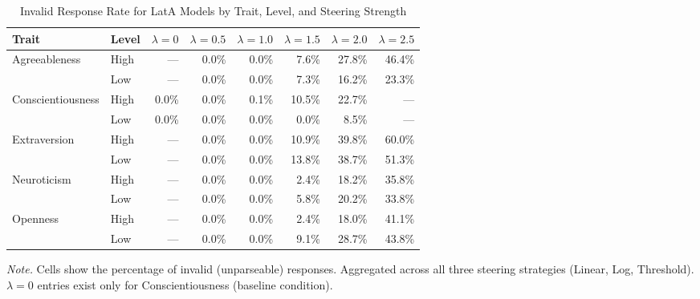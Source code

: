 \begin{table}[htbp]
\begin{threeparttable}
\caption{Invalid Response Rate for LatA Models by Trait, Level, and Steering Strength}
\label{tab:lata_lambda_validity}
\centering
\footnotesize
\setlength{\tabcolsep}{4pt}
\begin{tabular}{llrrrrrr}
\toprule
Trait & Level & $\lambda=0$ & $\lambda=0.5$ & $\lambda=1.0$ & $\lambda=1.5$ & $\lambda=2.0$ & $\lambda=2.5$ \\
\midrule
  Agreeableness & High & — & 0.0\% & 0.0\% & 7.6\% & 27.8\% & 46.4\% \\
   & Low & — & 0.0\% & 0.0\% & 7.3\% & 16.2\% & 23.3\% \\
\addlinespace
  Conscientiousness & High & 0.0\% & 0.0\% & 0.1\% & 10.5\% & 22.7\% & — \\
   & Low & 0.0\% & 0.0\% & 0.0\% & 0.0\% & 8.5\% & — \\
\addlinespace
  Extraversion & High & — & 0.0\% & 0.0\% & 10.9\% & 39.8\% & 60.0\% \\
   & Low & — & 0.0\% & 0.0\% & 13.8\% & 38.7\% & 51.3\% \\
\addlinespace
  Neuroticism & High & — & 0.0\% & 0.0\% & 2.4\% & 18.2\% & 35.8\% \\
   & Low & — & 0.0\% & 0.0\% & 5.8\% & 20.2\% & 33.8\% \\
\addlinespace
  Openness & High & — & 0.0\% & 0.0\% & 2.4\% & 18.0\% & 41.1\% \\
   & Low & — & 0.0\% & 0.0\% & 9.1\% & 28.7\% & 43.8\% \\
\bottomrule
\end{tabular}
\begin{tablenotes}
\footnotesize
\item \textit{Note.} Cells show the percentage of invalid (unparseable) responses. Aggregated across all three steering strategies (Linear, Log, Threshold). $\lambda = 0$ entries exist only for Conscientiousness (baseline condition).
\end{tablenotes}
\end{threeparttable}
\end{table}